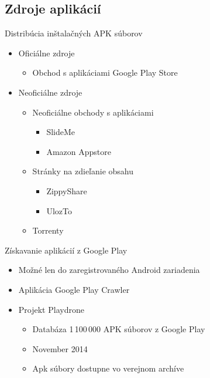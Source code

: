 \documentclass{beamer}
\begin{document}
  \subsection{Zdroje aplikácií}
  \begin{frame}[label=lists]{Distribúcia inštalačných APK súborov}
    \begin{itemize}
    \item Oficiálne zdroje
    	\begin{itemize} 
    	\item Obchod s aplikáciami Google Play Store 
    	\end{itemize}
    \item Neoficiálne zdroje
    	\begin{itemize}
    	\item Neoficiálne obchody s aplikáciami
    		\begin{itemize}
    		\item SlideMe
    		\item Amazon Appstore 
			\end{itemize}    	 
    	\end{itemize}
    	\begin{itemize}
    	\item Stránky na zdieľanie obsahu
    		\begin{itemize}
    		\item ZippyShare
    		\item UlozTo 
			\end{itemize}    	 
    	\end{itemize}
    	\begin{itemize}
    	\item Torrenty
    	\end{itemize}
    \end{itemize}  
  \end{frame}  
  
   \begin{frame}[label=lists]{Získavanie aplikácií z Google Play}
    \begin{itemize}
  		\item Možné len do zaregistrovaného Android zariadenia
  		\item Aplikácia Google Play Crawler \cite{crawler}
  		\item Projekt Playdrone
  			\begin{itemize}
  			\item Databáza 1\,100\,000 APK súborov z Google Play
			\item November 2014
  			\item Apk súbory dostupne vo verejnom archíve
  			\end{itemize}
    \end{itemize}  
  \end{frame}  
\end{document}
